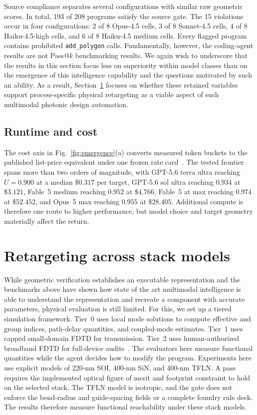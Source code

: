 \documentclass[%
 reprint,
 superscriptaddress,
 amsmath,amssymb,
 aps,
 pra,
 longbibliography,
 floatfix,
]{revtex4-2}
\begin{document}
Source compliance separates several configurations with similar raw
geometric scores. In total, 193 of 208 programs satisfy the source gate.
The 15 violations occur in four configurations: 2 of 8 Opus-4.5 cells, 3 of
8 Sonnet-4.5 cells, 4 of 8 Haiku-4.5-high cells, and 6 of 8 Haiku-4.5 medium
cells. Every flagged program contains prohibited \texttt{add\_polygon} calls.
Fundamentally, however, the coding-agent results are not Pass@$k$
benchmarking results. We again wish to underscore that the results in this
section focus less on superiority within model classes than on the emergence
of this intelligence capability and the questions motivated by such an
ability. As a result, Section~\ref{sec:pdk} focuses on whether these retained
variables support process-specific physical retargeting as a viable aspect of
such multimodal photonic design automation.

\subsection{Runtime and cost}\label{sec:inference}

The cost axis in Fig.~\ref{fig:emergence}(a) converts measured token buckets
to the published list-price equivalent under one frozen rate
card~\cite{openai_pricing,anthropic_pricing}. The tested frontier spans more
than two orders of magnitude, with GPT-5.6 terra ultra reaching $U=0.900$ at
a median $\$0.317$ per target, GPT-5.6 sol ultra reaching $0.934$ at
$\$3.121$, Fable~5 medium reaching $0.952$ at $\$4.766$, Fable~5 at max
reaching $0.974$ at $\$52.452$, and Opus~5 max reaching $0.955$ at
$\$28.405$. Additional compute is therefore one route to higher performance,
but model choice and target geometry materially affect the return.

\section{Retargeting across stack models}\label{sec:pdk}

While geometric verification establishes an executable representation and
the benchmarks above have shown how state of the art multimodal intelligence
is able to understand the representation and recreate a component with
accurate parameters, physical evaluation is still limited. For this, we set
up a tiered simulation framework. Tier~0 uses local mode solutions to compute
effective and group indices, path-delay quantities, and coupled-mode
estimates. Tier~1 uses capped small-domain FDTD for transmission. Tier~2 uses
human-authorized broadband FDTD for full-device audits~\cite{tidy3d}. The
evaluators here measure functional quantities while the agent decides how to
modify the program. Experiments here use explicit models of 220-nm SOI,
400-nm SiN, and 400-nm TFLN. A pass requires the implemented optical figure
of merit and footprint constraint to hold on the selected stack. The TFLN
model is isotropic, and the gate does not enforce the bend-radius and
guide-spacing fields or a complete foundry rule deck. The results therefore
measure functional reachability under these stack models.
\end{document}
